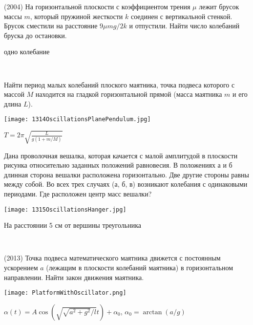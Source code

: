 \begin{ex}
(2004) На горизонтальной плоскости с коэффициентом трения $\mu$ лежит брусок массы $m$, который пружиной жесткости $k$ соединен с вертикальной стенкой. Брусок сместили на расстояние $9\mu mg /2k$ и отпустили. Найти число колебаний бруска до остановки.
\begin{ans}
одно колебание
\end{ans}
\end{ex}

\begin{ex}
\hspace{0pt} \\
\begin{minipage}{.65\textwidth} 
Найти период малых колебаний плоского маятника, точка подвеса которого с массой $M$ находится на гладкой горизонтальной прямой 
(масса маятника $m$ и его длина $L$).
\end{minipage}
\begin{minipage}{.35\textwidth}
\centering
\texttt{[image: 1314OscillationsPlanePendulum.jpg]}
\end{minipage}
\begin{ans}
$T=2\pi \sqrt{\frac{L}{g(1+m/M)}}$
\end{ans}
\end{ex}

\begin{ex}
Дана проволочная вешалка, которая качается с малой амплитудой в плоскости рисунка относительно заданных положений равновесия. 
В положениях а и б длинная сторона вешалки расположена горизонтально. Две другие стороны равны между собой. 
Во всех трех случаях (а, б, в) возникают колебания с одинаковыми периодами. Где расположен центр масс вешалки?
\begin{center}
\texttt{[image: 1315OscillationsHanger.jpg]}
\end{center}
\begin{ans}
На расстоянии 5 см от вершины треугольника
\end{ans}
\end{ex}

\begin{ex}
\hspace{0pt} \\
\begin{minipage}{.65\textwidth}
(2013) Точка подвеса математического маятника движется с постоянным ускорением $a$ (лежащим в плоскости колебаний маятника) в горизонтальном направлении. Найти закон движения маятника.
\end{minipage}
\begin{minipage}{.35\textwidth}
\centering
\texttt{[image: PlatformWithOscillator.png]}
\end{minipage}
\begin{ans}
$\alpha(t) = A \cos(\sqrt{\sqrt{a^2+g^2}/l}t) + \alpha_0$, $\alpha_0 = \arctan(a/g)$
\end{ans}
\end{ex}


